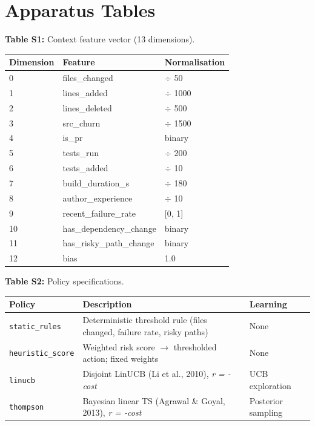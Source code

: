 \documentclass[10pt]{article}
\begin{document}
\section*{Apparatus Tables}

\noindent\textbf{Table S1:} Context feature vector (13 dimensions).

\begin{table}[t]\centering\footnotesize\begin{tabular}{lll}
\toprule\noalign{}
Dimension & Feature & Normalisation \\
\midrule\noalign{}
\bottomrule\noalign{}
0 & files\_changed & $\div$ 50 \\
1 & lines\_added & $\div$ 1000 \\
2 & lines\_deleted & $\div$ 500 \\
3 & src\_churn & $\div$ 1500 \\
4 & is\_pr & binary \\
5 & tests\_run & $\div$ 200 \\
6 & tests\_added & $\div$ 10 \\
7 & build\_duration\_s & $\div$ 180 \\
8 & author\_experience & $\div$ 10 \\
9 & recent\_failure\_rate & {[}0, 1{]} \\
10 & has\_dependency\_change & binary \\
11 & has\_risky\_path\_change & binary \\
12 & bias & 1.0 \\
\end{tabular}\end{table}

\noindent\textbf{Table S2:} Policy specifications.

\begin{table}[t]\centering\footnotesize\begin{tabular}{lll}
\toprule\noalign{}
Policy
 & Description
 & Learning
 \\
\midrule\noalign{}
\bottomrule\noalign{}
\texttt{static\_rules} & Deterministic threshold rule (files changed,
failure rate, risky paths) & None \\
\texttt{heuristic\_score} & Weighted risk score $\rightarrow$ thresholded action;
fixed weights & None \\
\texttt{linucb} & Disjoint LinUCB (Li et al., 2010), \emph{r = -cost} &
UCB exploration \\
\texttt{thompson} & Bayesian linear TS (Agrawal \& Goyal, 2013), \emph{r
= -cost} & Posterior sampling \\
\end{tabular}\end{table}
\end{document}
